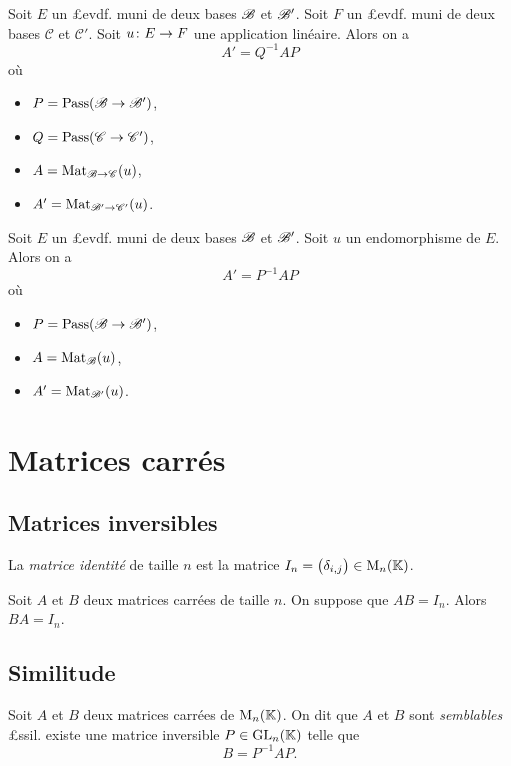 \documentclass{yann}
\newcommand\BC{\mathscr{C}}
\begin{document}

Soit $E$ un £evdf. muni de deux bases $\mathscr{B}$ et $\mathscr{B}'$.
Soit $F$ un £evdf. muni de deux bases $\BC$ et $\BC'$.
Soit $u\colon E\to F$ une application linéaire.
Alors on a \[ A' = Q^{-1} A P \]
où
\begin{itemize}
\item $P = \operatorname{Pass}(\mathscr{B} \to \mathscr{B}')$,
\item $Q = \Pass(\BC \to \BC')$,
\item $A = \Mat_{\B \to \BC}(u)$,
\item $A' = \Mat_{\B' \to \BC'}(u)$.
\end{itemize}


Soit $E$ un £evdf. muni de deux bases $\mathscr{B}$ et $\mathscr{B}'$.
Soit $u$ un endomorphisme de $E$.
Alors on a \[ A' = P^{-1} A P \]
où
\begin{itemize}
\item $P = \operatorname{Pass}(\mathscr{B} \to \mathscr{B}')$,
\item $A = \operatorname*{Mat}_{\mathscr{B}}(u)$,
\item $A' = \operatorname*{Mat}_{\mathscr{B}'}(u)$.
\end{itemize}

\section{Matrices carrés}

\subsection{Matrices inversibles}


La \emph{matrice identité} de taille $n$ est la matrice
$I_n = \bigl({ \delta_{i,j} }\bigr) \in \mathrm{M}_{n}({\mathbb{K}})$.


Soit $A$ et $B$ deux matrices carrées de taille $n$.
On suppose que $AB = I_n$.
Alors $BA = I_n$.

\subsection{Similitude}


Soit $A$ et $B$ deux matrices carrées de $\mathrm{M}_{n}({\mathbb{K}})$.
On dit que $A$ et $B$ sont \emph{semblables}
£ssil. existe une matrice inversible $P\in\mathrm{GL}_{n}({\mathbb{K}})$
telle que \[ B = P^{-1} A P. \]
\end{document}
